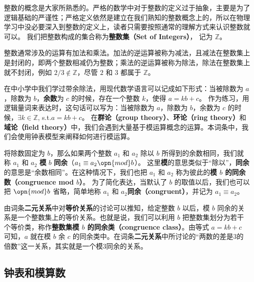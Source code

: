 


整数的概念是大家所熟悉的。严格的数学中对于整数的定义过于抽象，主要是为了逻辑基础的严谨性；严格定义依然是建立在我们熟知的整数概念上的，所以在物理学习中没必要深入到整数的定义上，读者只需要按照通常的理解方式来认识整数就可以。 我们把整数构成的集合称为\textbf{整数集（Set of Integers）}， 记为 $\mathbb{Z}$。

整数通常涉及的运算有加法和乘法。加法的逆运算被称为减法，且减法在整数集上是封闭的，即两个整数相减仍为整数；乘法的逆运算被称为除法，除法在整数集上就不封闭，例如 $2/3\not\in\mathbb{Z}$，尽管 $2$ 和 $3$ 都属于 $\mathbb{Z}$。

在中小学中我们学过带余除法，用现代数学语言可以记成如下形式：当被除数为 $a$，除数为 $b$，\textbf{余数}为 $c$ 的时候，存在一个整数 $k$，使得 $a=kb+c$。 作为练习，用逻辑量词来表达时，这句话可以写为：当被除数为 $a$，除数为 $b$，余数为 $c$ 的时候，$\exists k\in \mathbb{Z}$, s.t.$ a=kb+c$。 在\textbf{群论（group theory）}、\textbf{环论（ring theory）}和\textbf{域论（field theory）}中，我们会遇到大量基于模运算概念的运算。本词条中，我们会使用钟表模型来阐释如何进行模运算。

将除数固定为 $b$，那么如果两个整数 $a_1$ 和 $a_2$ 除以 $b$ 所得到的余数相同，我们就称 $a_1$ 和 $a_2$ \textbf{模} $b$ \textbf{同余}（$a_1\equiv a_2 \opn{mod} b$）。 这里\textbf{模}的意思类似于“除以”，\textbf{同余}的意思是“余数相同”。在这种情况下，我们也把 $a_1$ 和 $a_2$ 称为彼此的\textbf{模 $b$ 的同余数（congruence mod $b$）}。 为了简化表达，当默认了 $b$ 的取值以后，我们也可以把 $\opn{mod} b$ 省略，简单地称 $a_1$ 和 $a_2$\textbf{同余（congruent）}，并记为 $a_1\equiv a_2$。 

由词条\textbf{二元关系}中对\textbf{等价关系}的讨论可以推知，给定整数 $b$ 以后，模 $b$ 同余的关系是一个整数集上的等价关系。也就是说，我们可以利用 $b$ 把整数集划分为若干个等价类，称作\textbf{整数集模 $b$ 的同余类（congruence class）}。由等式 $a=kb+c$ 可知，$a$ 就在模 $b$ 余 $c$ 的同余类中。在词条\textbf{二元关系}中所讨论的“两数的差是3的倍数”这一关系，其实就是一个模3同余的关系。



\subsection{钟表和模算数}

